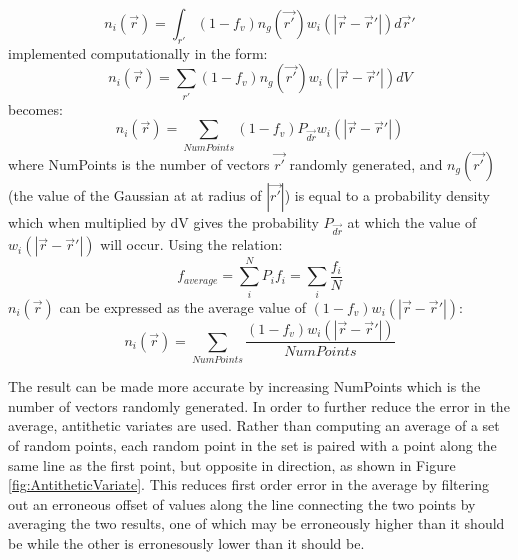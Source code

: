 \documentclass[12pt]{article}
\begin{document}
\begin{equation}{n_i(\vec{r})= \int_{r'}{(1-f_v)n_g(\vec{r'})w_i(|\vec{r}-\vec{r}'|)} {d}\vec{r}'}\end{equation} implemented computationally in the form:
\begin{equation}{n_i(\vec{r})= \sum_{r'}{(1-f_v)n_g(\vec{r'})w_i(|\vec{r}-\vec{r}'|)dV}}\end{equation} becomes:
\begin{equation}{n_i(\vec{r})= \sum_{NumPoints}(1-f_v)P_{\vec{dr}}w_i(|\vec{r}-\vec{r}'|)}\end{equation} where NumPoints is the number of vectors $\vec{r'}$ randomly generated, and $n_g(\vec{r'})$ (the value of the Gaussian at at radius of $|\vec{r'}|$) is equal to a probability density which when multiplied by dV gives the probability $P_{\vec{dr}}$ at which the value of $w_i(|\vec{r}-\vec{r}'|)$ will occur. 
Using the relation:
\begin{displaymath}{f_{average}=\sum_i^N{P_if_i}=\sum_i{\frac{f_i}{N}}}\end{displaymath} $n_i(\vec{r})$ can be expressed as the average value of $(1-f_v)w_i(|\vec{r}-\vec{r}'|)$:
\begin{equation}{n_i(\vec{r})=\sum_{NumPoints}\frac{(1-f_v)w_i(|\vec{r}-\vec{r}'|)}{NumPoints}}\end{equation}

The result can be made more accurate by increasing NumPoints which is the number of vectors randomly generated. In order to further reduce the error in the average, antithetic variates are used. Rather than computing an average of a set of random points, each random point in the set is paired with a point along the same line as the first point, but opposite in direction, as shown in Figure \ref{fig:AntitheticVariate}. This reduces first order error in the average by filtering out an erroneous offset of values along the line connecting the two points by averaging the two results, one of which may be erroneously higher than it should be while the other is erronesously lower than it should be.
\end{document}
